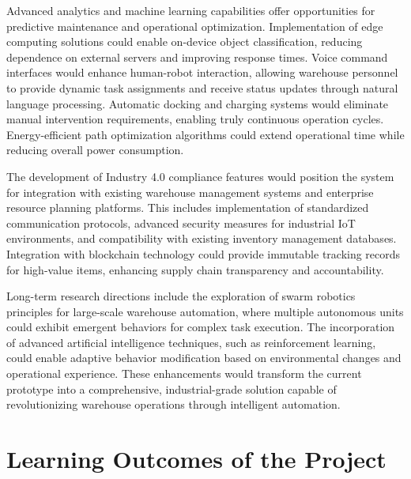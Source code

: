 Advanced analytics and machine learning capabilities offer opportunities for predictive maintenance and operational optimization. Implementation of edge computing solutions could enable on-device object classification, reducing dependence on external servers and improving response times. Voice command interfaces would enhance human-robot interaction, allowing warehouse personnel to provide dynamic task assignments and receive status updates through natural language processing. Automatic docking and charging systems would eliminate manual intervention requirements, enabling truly continuous operation cycles. Energy-efficient path optimization algorithms could extend operational time while reducing overall power consumption.

The development of Industry 4.0 compliance features would position the system for integration with existing warehouse management systems and enterprise resource planning platforms. This includes implementation of standardized communication protocols, advanced security measures for industrial IoT environments, and compatibility with existing inventory management databases. Integration with blockchain technology could provide immutable tracking records for high-value items, enhancing supply chain transparency and accountability.

Long-term research directions include the exploration of swarm robotics principles for large-scale warehouse automation, where multiple autonomous units could exhibit emergent behaviors for complex task execution. The incorporation of advanced artificial intelligence techniques, such as reinforcement learning, could enable adaptive behavior modification based on environmental changes and operational experience. These enhancements would transform the current prototype into a comprehensive, industrial-grade solution capable of revolutionizing warehouse operations through intelligent automation.

\section{Learning Outcomes of the Project}

